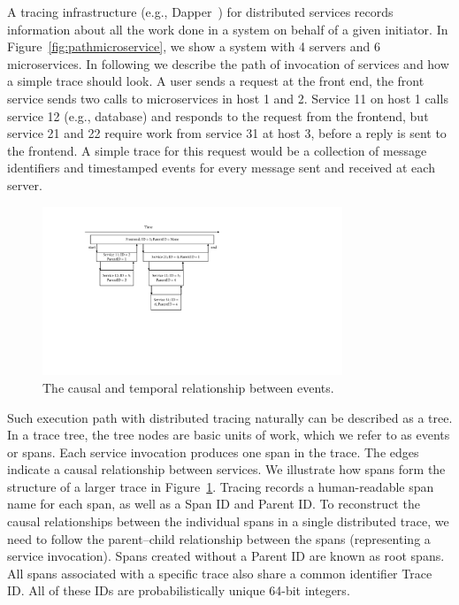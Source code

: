 A tracing infrastructure (e.g., Dapper~\cite{sigelman2010dapper}) for distributed services records information about all the work done in a system on behalf of a given initiator. In Figure~\ref{fig:pathmicroservice}, we show a system with 4 servers and 6 microservices. In following we describe the path of invocation of services and how a simple trace should look. A user sends a request at the front end, the front service sends two calls to microservices in host 1 and 2. Service 11 on host 1 calls service 12 (e.g., database) and responds to the request from the frontend, but service 21 and 22 require work from service 31 at host 3, before a reply is sent to the frontend. A simple trace for this request would be a collection of message identifiers and timestamped events for every message sent and received at each server.

\begin{figure}[htbp]
\centerline{\includegraphics[width=0.8\textwidth]{gfx/chap2/temporal_relationship.pdf}}
\caption{The causal and temporal relationship between events.}
\label{fig:temporalevents}
\end{figure}

Such execution path with distributed tracing naturally can be described as a tree. In a trace tree, the tree nodes are basic units of work, which we refer to as events or spans. Each service invocation produces one span in the trace. The edges indicate a causal relationship between services. We illustrate how spans form the structure of a larger trace in Figure~\ref{fig:temporalevents}. Tracing records a human-readable span name for each span, as well as a Span ID and Parent ID. To reconstruct the causal relationships between the individual spans in a single distributed trace, we need to follow the parent--child relationship between the spans (representing a service invocation). Spans created without a Parent ID are known as root spans. All spans associated with a specific trace also share a common identifier Trace ID. All of these IDs are probabilistically unique 64-bit integers.

